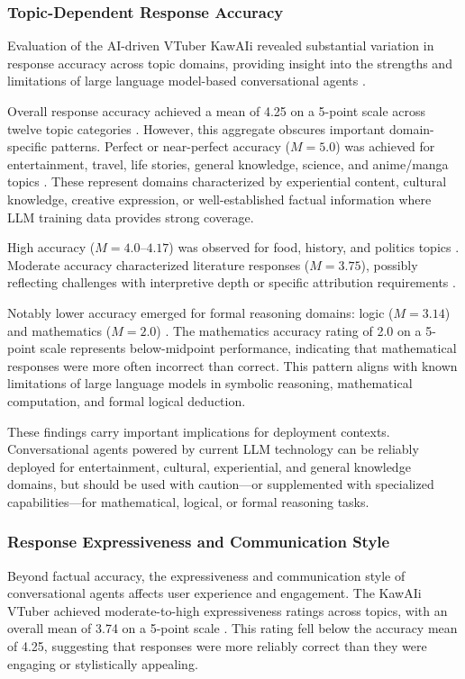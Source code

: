 \documentclass[manuscript,anonymous,sigconf]{acmart}
\begin{document}
\subsubsection{Topic-Dependent Response Accuracy}

Evaluation of the AI-driven VTuber KawAIi revealed substantial variation in response accuracy across topic domains, providing insight into the strengths and limitations of large language model-based conversational agents \cite{A81}.

Overall response accuracy achieved a mean of 4.25 on a 5-point scale across twelve topic categories \cite{A81}. However, this aggregate obscures important domain-specific patterns. Perfect or near-perfect accuracy ($M = 5.0$) was achieved for entertainment, travel, life stories, general knowledge, science, and anime/manga topics \cite{A81}. These represent domains characterized by experiential content, cultural knowledge, creative expression, or well-established factual information where LLM training data provides strong coverage.

High accuracy ($M = 4.0$--$4.17$) was observed for food, history, and politics topics \cite{A81}. Moderate accuracy characterized literature responses ($M = 3.75$), possibly reflecting challenges with interpretive depth or specific attribution requirements \cite{A81}.

Notably lower accuracy emerged for formal reasoning domains: logic ($M = 3.14$) and mathematics ($M = 2.0$) \cite{A81}. The mathematics accuracy rating of 2.0 on a 5-point scale represents below-midpoint performance, indicating that mathematical responses were more often incorrect than correct. This pattern aligns with known limitations of large language models in symbolic reasoning, mathematical computation, and formal logical deduction.

These findings carry important implications for deployment contexts. Conversational agents powered by current LLM technology can be reliably deployed for entertainment, cultural, experiential, and general knowledge domains, but should be used with caution---or supplemented with specialized capabilities---for mathematical, logical, or formal reasoning tasks.

\subsubsection{Response Expressiveness and Communication Style}

Beyond factual accuracy, the expressiveness and communication style of conversational agents affects user experience and engagement. The KawAIi VTuber achieved moderate-to-high expressiveness ratings across topics, with an overall mean of 3.74 on a 5-point scale \cite{A81}. This rating fell below the accuracy mean of 4.25, suggesting that responses were more reliably correct than they were engaging or stylistically appealing.
\end{document}
